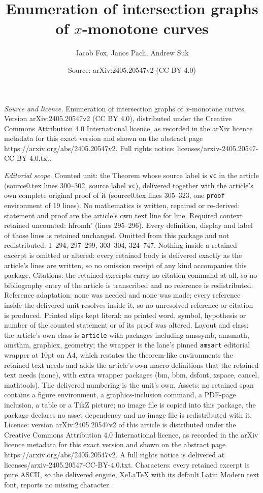 \documentclass[10pt,a4paper]{amsart}
\title[Enumeration of intersection graphs of $x$-monotone curves]{Enumeration of intersection graphs of $x$-monotone curves}
\author{Jacob Fox, Janos Pach, Andrew Suk}
\date{Source: arXiv:2405.20547v2 (CC BY 4.0)}
\begin{document}
\maketitle

\noindent\emph{Source and licence.} Enumeration of intersection graphs of $x$-monotone curves. Version arXiv:2405.20547v2 (CC BY 4.0), distributed under the Creative Commons Attribution 4.0 International licence, as recorded in the arXiv licence metadata for this exact version and shown on the abstract page https://arxiv.org/abs/2405.20547v2. Full rights notice: licenses/arxiv-2405.20547-CC-BY-4.0.txt.\par\smallskip

\noindent\textit{Editorial scope.} Counted unit: the Theorem whose source label is \texttt{vc} in the article (source0.tex lines 300--302, source label \texttt{vc}), delivered together with the article's own complete original proof of it (source0.tex lines 305--323, one \texttt{proof} environment of 19 lines). No mathematics is written, repaired or re-derived: statement and proof are the article's own text line for line. Required context retained uncounted: hfromh' (lines 295--296). Every definition, display and label of those lines is retained unchanged. Omitted from this package and not redistributed: 1--294, 297--299, 303--304, 324--747. Nothing inside a retained excerpt is omitted or altered: every retained body is delivered exactly as the article's lines are written, so no omission receipt of any kind accompanies this package. Citations: the retained excerpts carry no citation command at all, so no bibliography entry of the article is transcribed and no reference is redistributed. Reference adaptation: none was needed and none was made; every reference inside the delivered unit resolves inside it, so no unresolved reference or citation is produced. Printed slips kept literal: no printed word, symbol, hypothesis or number of the counted statement or of its proof was altered. Layout and class: the article's own class is \texttt{article} with packages including amssymb, amsmath, amsthm, graphicx, geometry; the wrapper is the lane's pinned \texttt{amsart} editorial wrapper at 10pt on A4, which restates the theorem-like environments the retained text needs and adds the article's own macro definitions that the retained text needs (none), with extra wrapper packages (bm, bbm, dsfont, xspace, cancel, mathtools). The delivered numbering is the unit's own. Assets: no retained span contains a figure environment, a graphics-inclusion command, a PDF-page inclusion, a table or a TikZ picture; no image file is copied into this package, the package declares no asset dependency and no image file is redistributed with it. Licence: version arXiv:2405.20547v2 of this article is distributed under the Creative Commons Attribution 4.0 International licence, as recorded in the arXiv licence metadata for this exact version and shown on the abstract page https://arxiv.org/abs/2405.20547v2. A full rights notice is delivered at licenses/arxiv-2405.20547-CC-BY-4.0.txt. Characters: every retained excerpt is pure ASCII, so the delivered engine, XeLaTeX with its default Latin Modern text font, reports no missing character.
\end{document}
